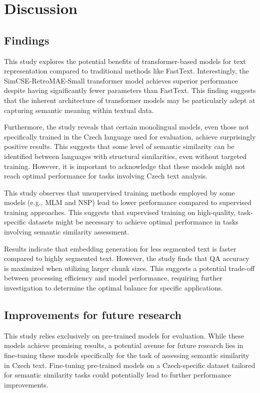 
\chapter{Discussion\label{chap:discussion}}

\section{Findings}
This study explores the potential benefits of transformer-based models for text representation compared to traditional methods like FastText.
Interestingly, the SimCSE-RetroMAE-Small transformer model achieves superior performance despite having significantly fewer parameters than FastText.
This finding suggests that the inherent architecture of transformer models may be particularly adept at capturing semantic meaning within textual data.

Furthermore, the study reveals that certain monolingual models, even those not specifically trained in the Czech language used for evaluation, achieve surprisingly positive results.
This suggests that some level of semantic similarity can be identified between languages with structural similarities, even without targeted training.
However, it is important to acknowledge that these models might not reach optimal performance for tasks involving Czech text analysis.

This study observes that unsupervised training methods employed by some models (e.g., \ac{MLM} and \ac{NSP}) lead to lower performance compared to supervised training approaches.
This suggests that supervised training on high-quality, task-specific datasets might be necessary to achieve optimal performance in tasks involving semantic similarity assessment.

Results indicate that embedding generation for less segmented text is faster compared to highly segmented text.
However, the study finds that \ac{QA} accuracy is maximized when utilizing larger chunk sizes.
This suggests a potential trade-off between processing efficiency and model performance, requiring further investigation to determine the optimal balance for specific applications.

\section{Improvements for future research}
This study relies exclusively on pre-trained models for evaluation.
While these models achieve promising results, a potential avenue for future research lies in fine-tuning these models specifically for the task of assessing semantic similarity in Czech text.
Fine-tuning pre-trained models on a Czech-specific dataset tailored for semantic similarity tasks could potentially lead to further performance improvements.

